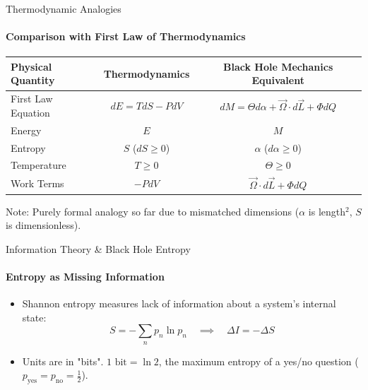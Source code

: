 \documentclass[aspectratio=169]{beamer}
\begin{document}
\begin{frame}{Thermodynamic Analogies}
\framesubtitle{Comparison with First Law of Thermodynamics}
  \begin{table}[h]
    \centering
    \begin{tabular}{|l|c|c|}
      \hline
      \textbf{Physical Quantity} & \textbf{Thermodynamics} & \textbf{Black Hole Mechanics Equivalent} \\
      \hline\hline
      First Law Equation & $dE = T dS - P dV$ & $dM = \Theta d\alpha + \vec{\Omega} \cdot d\vec{L} + \Phi dQ$ \\
      \hline
      Energy & $E$ & $M$ \\
      \hline
      Entropy & $S$ ($dS \ge 0$) & $\alpha$ ($d\alpha \ge 0$) \\
      \hline
      Temperature & $T \ge 0$ & $\Theta \ge 0$ \\
      \hline
      Work Terms & $-P dV$ & $\vec{\Omega} \cdot d\vec{L} + \Phi dQ$ \\
      \hline
    \end{tabular}
  \end{table}

  \vspace{0.3cm}
  \begin{alertblock}{Note:}
    Purely formal analogy so far due to mismatched dimensions ($\alpha$ is length$^2$, $S$ is dimensionless).
  \end{alertblock}
\end{frame}

\begin{frame}{Information Theory \& Black Hole Entropy}
\framesubtitle{Entropy as Missing Information}
   \begin{itemize}
        \item Shannon entropy measures lack of information about a system's internal state:
          \begin{equation*}
            S = -\sum_n p_n \ln p_n \quad \implies \quad \Delta I = -\Delta S
          \end{equation*}
        \item Units are in "bits". $1\text{ bit} = \ln 2$, the maximum entropy of a yes/no question ($p_{\text{yes}} = p_{\text{no}} = \tfrac12$).
    \end{itemize}
\end{frame}
\end{document}
